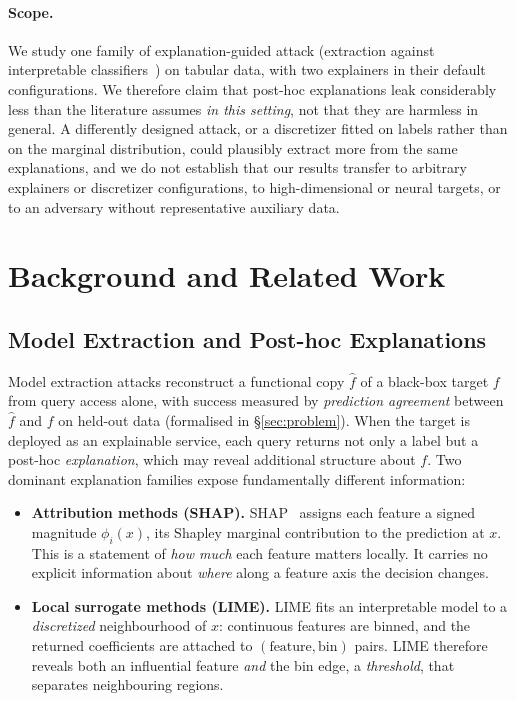\documentclass[sigconf,anonymous,review]{acmart}
\begin{document}
\paragraph{Scope.} We study one family of explanation-guided attack (extraction against interpretable
classifiers~\cite{oksuz2024autolycus}) on tabular data, with two explainers in their default
configurations. We therefore claim that post-hoc explanations leak considerably less than the
literature assumes \emph{in this setting}, not that they are harmless in general. A differently
designed attack, or a discretizer fitted on labels rather than on the marginal distribution, could
plausibly extract more from the same explanations, and we do not establish that our results transfer
to arbitrary explainers or discretizer configurations, to high-dimensional or neural targets, or to
an adversary without representative auxiliary data.

\section{Background and Related Work}
\label{sec:background}

\subsection{Model Extraction and Post-hoc Explanations}
\label{subsec:prelim}

Model extraction attacks reconstruct a functional copy $\hat{f}$ of a black-box
target $f$ from query access alone, with success measured by \emph{prediction
agreement} between $\hat{f}$ and $f$ on held-out data (formalised in
\S\ref{sec:problem}). When the target is deployed as an explainable service, each
query returns not only a label but a post-hoc \emph{explanation}, which may reveal
additional structure about $f$. Two dominant explanation families expose
fundamentally different information:

\begin{itemize}
  \item \textbf{Attribution methods (SHAP).} SHAP~\cite{lundberg2017shap} assigns
  each feature a signed magnitude $\phi_i(x)$, its Shapley marginal contribution
  to the prediction at $x$. This is a statement of \emph{how much} each feature matters locally. It carries no explicit information about \emph{where} along a
  feature axis the decision changes.
  \item \textbf{Local surrogate methods (LIME).} LIME fits an interpretable model
  to a \emph{discretized} neighbourhood of $x$: continuous features are binned, and
  the returned coefficients are attached to $(\text{feature}, \text{bin})$ pairs.
  LIME therefore reveals both an influential feature \emph{and} the bin edge, a \emph{threshold}, that separates neighbouring regions.
\end{itemize}
\end{document}
